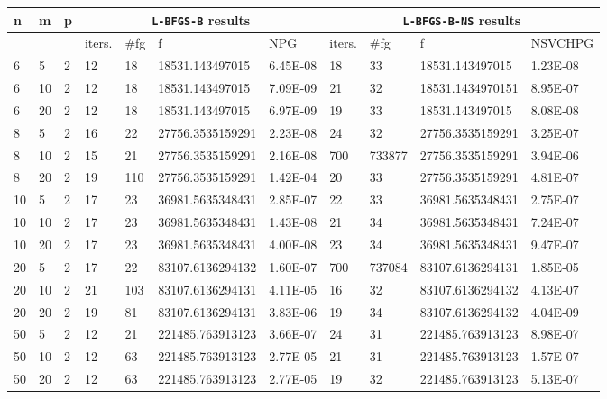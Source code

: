 \begin{center}
  \begin{table}
    \begin{center}
      \scriptsize
      \begin{tabular}{|l|l|l|l|l|l|l|l|l|l|l|}
        \hline
        n  &  m  &  p  & \multicolumn{4}{|c|}{\texttt{L-BFGS-B} results} & \multicolumn{4}{|c|}{\texttt{L-BFGS-B-NS} results} \\ \hline
        & &  & iters. & \#fg & f & NPG & iters. & \#fg & f & NSVCHPG \\ \hline
        6 & 5 & 2 & 12 & 18 & 18531.143497015 & 6.45E-08 & 18 & 33 & 18531.143497015 & 1.23E-08 \\
        6 & 10 & 2 & 12 & 18 & 18531.143497015 & 7.09E-09 & 21 & 32 & 18531.1434970151 & 8.95E-07 \\
        6 & 20 & 2 & 12 & 18 & 18531.143497015 & 6.97E-09 & 19 & 33 & 18531.143497015 & 8.08E-08\\
        8 & 5 & 2 & 16 & 22 & 27756.3535159291 & 2.23E-08 & 24 & 32 & 27756.3535159291 & 3.25E-07\\
        8 & 10 & 2 & 15 & 21 & 27756.3535159291 & 2.16E-08 & 700 & 733877 & 27756.3535159291 & 3.94E-06\\
        8 & 20 & 2 & 19 & 110 & 27756.3535159291 & 1.42E-04 & 20 & 33 & 27756.3535159291 & 4.81E-07\\
        10 & 5 & 2 & 17 & 23 & 36981.5635348431 & 2.85E-07 & 22 & 33 & 36981.5635348431 & 2.75E-07\\
        10 & 10 & 2 & 17 & 23 & 36981.5635348431 & 1.43E-08 & 21 & 34 & 36981.5635348431 & 7.24E-07\\
        10 & 20 & 2 & 17 & 23 & 36981.5635348431 & 4.00E-08 & 23 & 34 & 36981.5635348431 & 9.47E-07\\
        20 & 5 & 2 & 17 & 22 & 83107.6136294132 & 1.60E-07 & 700 & 737084 & 83107.6136294131 & 1.85E-05\\
        20 & 10 & 2 & 21 & 103 & 83107.6136294131 & 4.11E-05 & 16 & 32 & 83107.6136294132 & 4.13E-07\\
        20 & 20 & 2 & 19 & 81 & 83107.6136294131 & 3.83E-06 & 19 & 34 & 83107.6136294132 & 4.04E-09\\
        50 & 5 & 2 & 12 & 21 & 221485.763913123 & 3.66E-07 & 24 & 31 & 221485.763913123 & 8.98E-07\\
        50 & 10 & 2 & 12 & 63 & 221485.763913123 & 2.77E-05 & 21 & 31 & 221485.763913123 & 1.57E-07\\
        50 & 20 & 2 & 12 & 63 & 221485.763913123 & 2.77E-05 & 19 & 32 & 221485.763913123 & 5.13E-07\\

\end{tabular}
\end{center}
\end{table}
\end{center}
